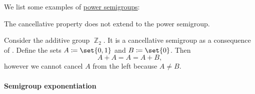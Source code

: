 \begin{example}\label{ex:def:power_semigroup}
  We list some examples of \hyperref[def:power_semigroup]{power semigroups}:
  \begin{thmenum}
     The cancellative property does not extend to the power semigroup.

    Consider the additive group \hyperref[def:group_of_integers_modulo]{\( \BbbZ_2 \)}. It is a cancellative semigroup as a consequence of . Define the sets \( A \coloneqq \set{ 0, 1 } \) and \( B \coloneqq \set{ 0 } \). Then
    \begin{equation*}
      A + A = A = A + B,
    \end{equation*}
    however we cannot cancel \( A \) from the left because \( A \neq B \).
  \end{thmenum}
\end{example}

\paragraph{Semigroup exponentiation}


